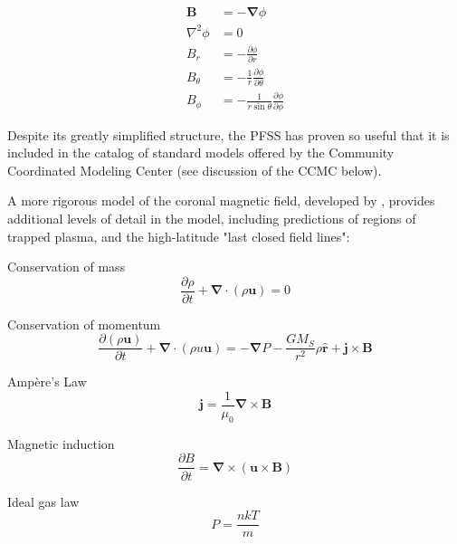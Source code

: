 \documentclass{article}
\begin{document}
\begin{align}
    \mathbf B &= - \mathbf \nabla \phi \\
    \nabla^2 \phi &= 0 \\
    B_r &= - \frac {\partial \phi} {\partial r} \\
    B_{\theta} &= - \frac {1} {r} \frac {\partial \phi} {\partial \theta} \\
    B_{\phi} &= - \frac {1} {r \sin \theta} \frac {\partial \phi} {\partial \phi}
    \label{eq:PFSS}
\end{align}

\noindent Despite its greatly simplified structure, the PFSS has proven so useful that it is included in the catalog of standard models offered by the Community Coordinated Modeling Center (see discussion of the CCMC below).

A more rigorous model of the coronal magnetic field, developed by \cite{Endeve2003}, provides additional levels of detail in the model, including predictions of regions of trapped plasma, and the high-latitude "last closed field lines":

\bigskip

Conservation of mass
\begin{equation}
    \frac {\partial \rho} {\partial t} + \mathbf \nabla \cdotp \left(\rho \mathbf u \right) = 0
    \label{eq:ELH1}
\end{equation}

Conservation of momentum
\begin{equation}
    \frac {\partial \left( \rho \mathbf u \right)} {\partial t} + \mathbf \nabla \cdotp \left(\rho u \mathbf u \right) = - \mathbf \nabla P - \frac {G M_S} {r^2} \rho \mathbf {\hat r} + \mathbf j \times \mathbf B
    \label{eq:ELH2}
\end{equation}

Amp\`ere's Law
\begin{equation}
    \mathbf j = \frac {1} {\mu_0} \mathbf \nabla \times \mathbf B
    \label{eq:ELH3}
\end{equation}

Magnetic induction
\begin{equation}
    \frac {\partial B} {\partial t} = \mathbf \nabla \times \left( \mathbf u \times \mathbf B \right)
    \label{eq:ELH4}
\end{equation}

Ideal gas law
\begin{equation}
    P = \frac {n k T} {m}
    \label{eq:ELH5}
\end{equation}
\end{document}
